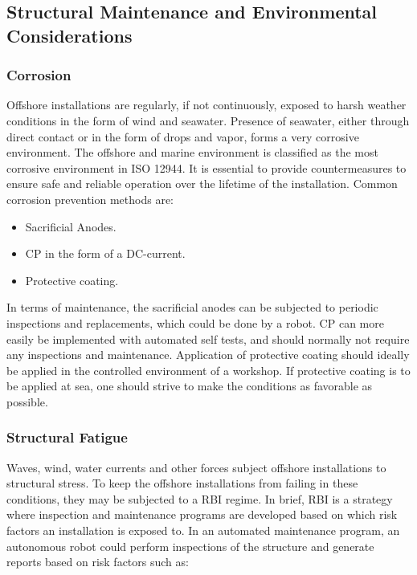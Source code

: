 \subsection{Structural Maintenance and Environmental Considerations}

\subsubsection{Corrosion}

Offshore installations are regularly, if not continuously, exposed to harsh weather conditions in the form of wind and seawater. Presence of seawater, either through direct contact or in the form of drops and vapor, forms a very corrosive environment. The offshore and marine environment is classified as the most corrosive environment in ISO 12944\cite{ElReedy2012383}. It is essential to provide countermeasures to ensure safe and reliable operation over the lifetime of the installation. Common corrosion prevention methods are\cite{ElReedy2012383}:

\begin{itemize}
	\item Sacrificial Anodes.
	\item \ac{CP} in the form of a DC-current.
	\item Protective coating.
\end{itemize} 

In terms of maintenance, the sacrificial anodes can be subjected to periodic inspections and replacements, which could be done by a robot. \ac{CP} can more easily be implemented with automated self tests, and should normally not require any inspections and maintenance\cite{ElReedy2012383}. Application of protective coating should ideally be applied in the controlled environment of a workshop. If protective coating is to be applied at sea, one should strive to make the conditions as favorable as possible. 

\subsubsection{Structural Fatigue}

Waves, wind, water currents and other forces subject offshore installations to structural stress. To keep the offshore installations from failing in these conditions, they may be subjected to a \ac{RBI} regime. In brief, \ac{RBI} is a strategy where inspection and maintenance programs are developed based on which risk factors an installation is exposed to. In an automated maintenance program, an autonomous robot could perform inspections of the structure and generate reports based on risk factors such as\cite{ElReedy2012563}:


